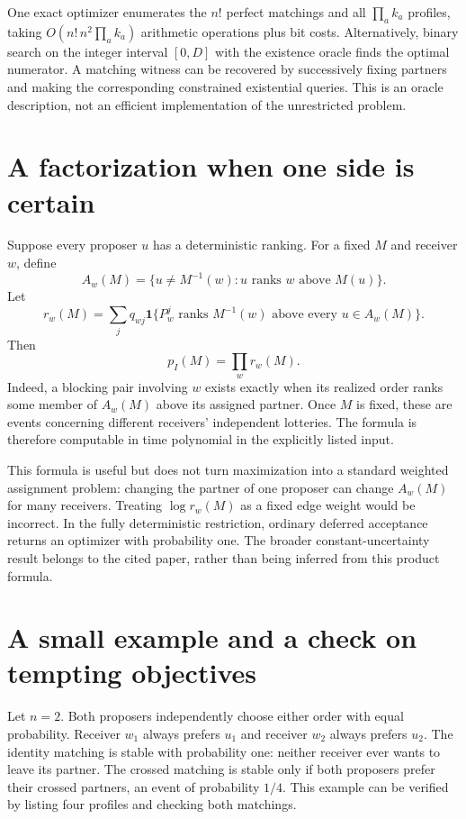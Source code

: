 \documentclass[11pt]{article}
\begin{document}
One exact optimizer enumerates the $n!$ perfect matchings and all $\prod_a k_a$ profiles, taking $O(n!\,n^2\prod_a k_a)$ arithmetic operations plus bit costs. Alternatively, binary search on the integer interval $[0,D]$ with the existence oracle finds the optimal numerator. A matching witness can be recovered by successively fixing partners and making the corresponding constrained existential queries. This is an oracle description, not an efficient implementation of the unrestricted problem.

\section*{A factorization when one side is certain}
Suppose every proposer $u$ has a deterministic ranking. For a fixed $M$ and receiver $w$, define
\[
 A_w(M)=\{u\ne M^{-1}(w):u\text{ ranks }w\text{ above }M(u)\}.
\]
Let
\[
 r_w(M)=\sum_j q_{wj}\mathbf1\{P_w^j\text{ ranks }M^{-1}(w)
                                   \text{ above every }u\in A_w(M)\}.
\]
Then
\[
                         p_I(M)=\prod_w r_w(M).
\]
Indeed, a blocking pair involving $w$ exists exactly when its realized order ranks some member of $A_w(M)$ above its assigned partner. Once $M$ is fixed, these are events concerning different receivers' independent lotteries. The formula is therefore computable in time polynomial in the explicitly listed input.

This formula is useful but does not turn maximization into a standard weighted assignment problem: changing the partner of one proposer can change $A_w(M)$ for many receivers. Treating $\log r_w(M)$ as a fixed edge weight would be incorrect. In the fully deterministic restriction, ordinary deferred acceptance returns an optimizer with probability one. The broader constant-uncertainty result belongs to the cited paper, rather than being inferred from this product formula.

\section*{A small example and a check on tempting objectives}
Let $n=2$. Both proposers independently choose either order with equal probability. Receiver $w_1$ always prefers $u_1$ and receiver $w_2$ always prefers $u_2$. The identity matching is stable with probability one: neither receiver ever wants to leave its partner. The crossed matching is stable only if both proposers prefer their crossed partners, an event of probability $1/4$. This example can be verified by listing four profiles and checking both matchings.
\end{document}

